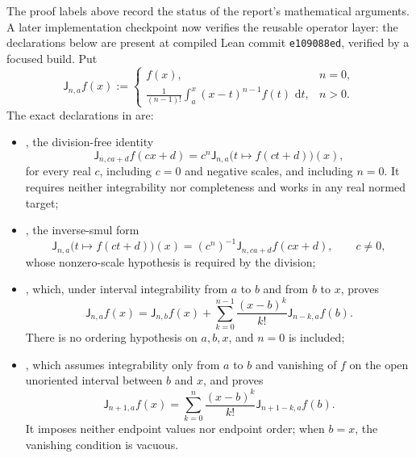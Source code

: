 \documentclass[11pt]{article}
\theoremstyle{definition}
\theoremstyle{remark}
\newcommand{\dd}{\,\mathrm d}
\begin{document}
The proof labels above record the status of the report's mathematical arguments.  A later
implementation checkpoint now verifies the reusable operator layer: the declarations below
are present at compiled Lean commit \texttt{e109088ed}, verified by a focused build.  Put
\begin{equation}
 \mathsf J_{n,a}f(x):=
 \begin{cases}
 f(x),&n=0,\\[1mm]
 \displaystyle\frac1{(n-1)!}\int_a^x(x-t)^{n-1}f(t)\,\dd t,&n>0.
 \end{cases}                                                \label{eq:lean-volterra-current}
\end{equation}
The exact declarations in  are:
\begin{itemize}
\item {}, the division-free identity
\begin{equation}
 \mathsf J_{n,ca+d}f(cx+d)
 =c^n\mathsf J_{n,a}\bigl(t\mapsto f(ct+d)\bigr)(x),          \label{eq:lean-affine-current}
\end{equation}
for every real \(c\), including \(c=0\) and negative scales, and including \(n=0\).  It
requires neither integrability nor completeness and works in any real normed target;
\item {}, the inverse-smul form
\begin{equation}
 \mathsf J_{n,a}\bigl(t\mapsto f(ct+d)\bigr)(x)
 =(c^n)^{-1}\mathsf J_{n,ca+d}f(cx+d),\qquad c\ne0,           \label{eq:lean-comp-affine-current}
\end{equation}
whose nonzero-scale hypothesis is required by the division;
\item {}, which, under interval integrability from
\(a\) to \(b\) and from \(b\) to \(x\), proves
\begin{equation}
 \mathsf J_{n,a}f(x)=\mathsf J_{n,b}f(x)
 +\sum_{k=0}^{n-1}\frac{(x-b)^k}{k!}\mathsf J_{n-k,a}f(b).    \label{eq:lean-basepoint-current}
\end{equation}
There is no ordering hypothesis on \(a,b,x\), and \(n=0\) is included;
\item {}, which assumes integrability only
from \(a\) to \(b\) and vanishing of \(f\) on the open unoriented interval between \(b\) and
\(x\), and proves
\begin{equation}
 \mathsf J_{n+1,a}f(x)
 =\sum_{k=0}^{n}\frac{(x-b)^k}{k!}\mathsf J_{n+1-k,a}f(b).    \label{eq:lean-zero-tail-current}
\end{equation}
It imposes neither endpoint values nor endpoint order; when \(b=x\), the vanishing condition
is vacuous.
\end{itemize}
\end{document}
